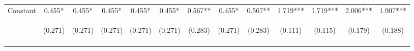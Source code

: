 \begin{center}
\begin{tabular}{lcccccccccccc}
Constant & 0.455* & 0.455* & 0.455* & 0.455* & 0.455* & 0.567** & 0.455* & 0.567** & 1.719*** & 1.719*** & 2.006*** & 1.907*** \\
 & \begin{footnotesize}(0.271)\end{footnotesize} & \begin{footnotesize}(0.271)\end{footnotesize} & \begin{footnotesize}(0.271)\end{footnotesize} & \begin{footnotesize}(0.271)\end{footnotesize} & \begin{footnotesize}(0.271)\end{footnotesize} & \begin{footnotesize}(0.283)\end{footnotesize} & \begin{footnotesize}(0.271)\end{footnotesize} & \begin{footnotesize}(0.283)\end{footnotesize} & \begin{footnotesize}(0.111)\end{footnotesize} & \begin{footnotesize}(0.115)\end{footnotesize} & \begin{footnotesize}(0.179)\end{footnotesize} & \begin{footnotesize}(0.188)\end{footnotesize} \\
\vspace{4pt} & \begin{footnotesize}\end{footnotesize} & \begin{footnotesize}\end{footnotesize} & \begin{footnotesize}\end{footnotesize} & \begin{footnotesize}\end{footnotesize} & \begin{footnotesize}\end{footnotesize} & \begin{footnotesize}\end{footnotesize} & \begin{footnotesize}\end{footnotesize} & \begin{footnotesize}\end{footnotesize} & \begin{footnotesize}\end{footnotesize} & \begin{footnotesize}\end{footnotesize} & \begin{footnotesize}\end{footnotesize} & \begin{footnotesize}\end{footnotesize} \\

\end{tabular}
\end{center}
